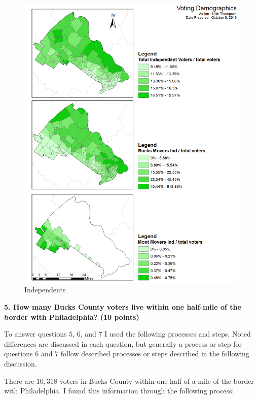 \documentclass[12pt]{article}
\begin{document}
\begin{figure}
	\caption{Independents}
	\centerline{\includegraphics[scale=.75]{question_4c.png}} %
\end{figure}

\clearpage	

\noindent \textbf{5.  How many Bucks County voters live within one half-mile of the border with Philadelphia?  (10 points)}

To answer questions $5$, $6$, and $7$ I used the following processes and steps.  Noted differences are discussed in each question, but generally a process or step for questions $6$ and $7$ follow described processes or steps described in the following discussion.

There are $10,318$ voters in Bucks County within one half of a mile of the border with Philadelphia.  I found this information through the following process:
\end{document}
